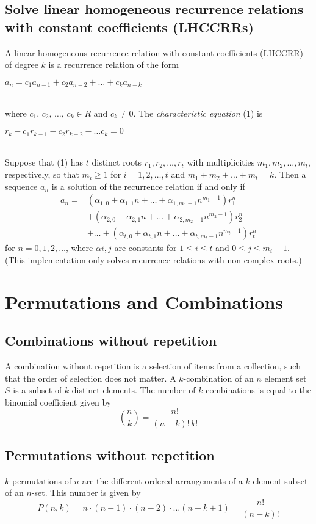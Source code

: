 \documentclass{article}
\begin{document}
\subsection{Solve linear homogeneous recurrence relations with constant coefficients (LHCCRRs)}
A linear homogeneous recurrence relation with constant coefficients (LHCCRR) of degree $k$ is a recurrence relation of the form\\
\centerline{$a_n = c_1a_{n-1} +c_2a_{n-2} + \dots +c_ka_{n-k}$}\\
where $c_1$, $c_2$, $\dots$, $c_k \in R$ and $c_k \neq 0$. The \emph{characteristic equation} (1) is\\
\centerline{$r_k - c_1r_{k-1} -c_2r_{k-2} - \dots c_k = 0$}\\
Suppose that (1) has $t$ distinct roots $r_1, r_2, \dots, r_t$ with multiplicities $m_1, m_2, \dots, m_t$, respectively, so that $m_i \ge 1$ for $i = 1, 2, \dots, t$ and $m_1 + m_2 + \dots + m_t = k$. Then a sequence $a_n$ is a solution of the recurrence relation if and only if
\begin{align*}
a_n =& (\alpha_{1,0} +\alpha_{1,1}n + \dots + \alpha_{1,m_1-1}n^{m_1-1})r_1^n\\
&+(\alpha_{2,0} +\alpha_{2,1}n + \dots + \alpha_{2,m_2-1}n^{m_2-1})r_2^n\\
&+\dots+ (\alpha_{t,0} +\alpha_{t,1}n + \dots + \alpha_{t,m_t-1}n^{m_t-1})r_t^n
\end{align*}
for $n = 0, 1, 2,\dots$, where $\alpha{i,j}$ are constants for $1 \le i \le t$ and $0 \le j \le m_i-1$.
(This implementation only solves recurrence relations with non-complex roots.)


\section{Permutations and Combinations}
\subsection{Combinations without repetition}
A combination without repetition is a selection of items from a collection, such that the order of selection does not matter. A $k$-combination of an $n$ element set $S$ is a subset of $k$ distinct elements. The number of $k$-combinations is equal to the binomial coefficient given by
\[{n \choose k} = \frac{n!}{(n-k)!\,k!}\]

\subsection{Permutations without repetition}
$k$-permutations of $n$ are the different ordered arrangements of a $k$-element subset of an $n$-set. This number is given by
\[P(n,k) = n \cdot (n-1) \cdot (n-2) \cdot \dots (n-k+1) = \frac{n!}{(n-k)!}\]
\end{document}
